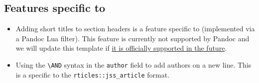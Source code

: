 \documentclass[
]{jss}
\providecommand{\tightlist}{%
  \setlength{\itemsep}{0pt}\setlength{\parskip}{0pt}}
\begin{document}
\subsection[Features specific to rticles]{Features specific to
}\label{features-specific-to}

\begin{itemize}
\tightlist
\item
  Adding short titles to section headers is a feature specific to
   (implemented via a Pandoc Lua filter). This feature is
  currently not supported by Pandoc and we will update this template if
  \href{https://github.com/jgm/pandoc/issues/4409}{it is officially
  supported in the future}.
\item
  Using the \texttt{\textbackslash{}AND} syntax in the \texttt{author}
  field to add authors on a new line. This is a specific to the
  \texttt{rticles::jss\_article} format.
\end{itemize}
\end{document}
